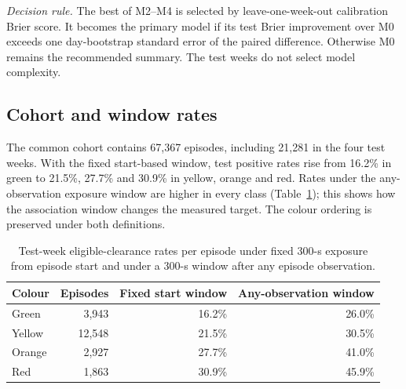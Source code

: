 \documentclass[aerospace,article,submit,moreauthors]{Definitions/mdpi}
\begin{document}
\emph{Decision rule.} The best of M2--M4 is selected by leave-one-week-out calibration Brier score. It becomes the primary model if its test Brier improvement over M0 exceeds one day-bootstrap standard error of the paired difference. Otherwise M0 remains the recommended summary. The test weeks do not select model complexity.



\subsection{Cohort and window rates}
The common cohort contains 67,367 episodes, including 21,281 in the four test weeks. With the fixed start-based window, test positive rates rise from 16.2\% in green to 21.5\%, 27.7\% and 30.9\% in yellow, orange and red. Rates under the any-observation exposure window are higher in every class (Table~\ref{tab:windows}); this shows how the association window changes the measured target. The colour ordering is preserved under both definitions.


\begin{table}[t]
\caption{Test-week eligible-clearance rates per episode under fixed 300-s exposure from episode start and under a 300-s window after any episode observation.}\label{tab:windows}
\begin{tabular}{@{}lrrr@{}}\toprule
Colour & Episodes & Fixed start window & Any-observation window\\\midrule
Green & 3,943 & 16.2\% & 26.0\%\\
Yellow & 12,548 & 21.5\% & 30.5\%\\
Orange & 2,927 & 27.7\% & 41.0\%\\
Red & 1,863 & 30.9\% & 45.9\%\\\bottomrule
\end{tabular}
\end{table}
\end{document}
